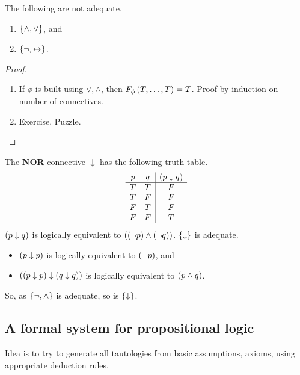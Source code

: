 \begin{example1}
The following are not adequate.
\begin{enumerate}
\item $ \left\{ \land, \lor \right\} $, and
\item $ \left\{ \neg, \leftrightarrow \right\} $.
\end{enumerate}
\end{example1}

\begin{proof}
\hfill
\begin{enumerate}
\item If $ \phi $ is built using $ \lor, \land $, then $ F_\phi\left( T, \dots, T \right) = T $. Proof by induction on number of connectives.
\item Exercise. Puzzle.
\end{enumerate}
\end{proof}

\begin{example1}
The \textbf{NOR} connective $ \downarrow $ has the following truth table.
$$
\begin{array}{cc|c}
p & q & \left( p \downarrow q \right) \\
\hline
T & T & F \\
T & F & F \\
F & T & F \\
F & F & T
\end{array}
$$
$ \left( p \downarrow q \right) $ is logically equivalent to $ \left( \left( \neg p \right) \land \left( \neg q \right) \right) $. $ \left\{ \downarrow \right\} $ is adequate.
\begin{itemize}
\item $ \left( p \downarrow p \right) $ is logically equivalent to $ \left( \neg p \right) $, and
\item $ \left( \left( p \downarrow p \right) \downarrow \left( q \downarrow q \right) \right) $ is logically equivalent to $ \left( p \land q \right) $.
\end{itemize}
So, as $ \left\{ \neg, \land \right\} $ is adequate, so is $ \left\{ \downarrow \right\} $.
\end{example1}

\pagebreak

\subsection{A formal system for propositional logic}

Idea is to try to generate all tautologies from basic assumptions, axioms, using appropriate deduction rules.


